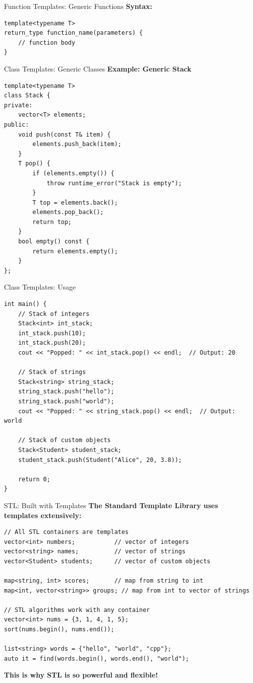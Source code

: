 \begin{frame}[fragile]{Function Templates: Generic Functions}
    \textbf{Syntax:}
    \begin{verbatim}
template<typename T>
return_type function_name(parameters) {
    // function body
}
    \end{verbatim}
\end{frame}

\begin{frame}[fragile]{Class Templates: Generic Classes}
    \textbf{Example: Generic Stack}
    \begin{verbatim}
template<typename T>
class Stack {
private:
    vector<T> elements;
public:
    void push(const T& item) {
        elements.push_back(item);
    }
    T pop() {
        if (elements.empty()) {
            throw runtime_error("Stack is empty");
        }
        T top = elements.back();
        elements.pop_back();
        return top;
    }
    bool empty() const {
        return elements.empty();
    }
};
    \end{verbatim}
\end{frame}

\begin{frame}[fragile]{Class Templates: Usage}
    \begin{verbatim}
int main() {
    // Stack of integers
    Stack<int> int_stack;
    int_stack.push(10);
    int_stack.push(20);
    cout << "Popped: " << int_stack.pop() << endl;  // Output: 20

    // Stack of strings
    Stack<string> string_stack;
    string_stack.push("hello");
    string_stack.push("world");
    cout << "Popped: " << string_stack.pop() << endl;  // Output: world

    // Stack of custom objects
    Stack<Student> student_stack;
    student_stack.push(Student("Alice", 20, 3.8));

    return 0;
}
    \end{verbatim}
\end{frame}

\begin{frame}[fragile]{STL: Built with Templates}
    \textbf{The Standard Template Library uses templates extensively:}
    \begin{verbatim}
// All STL containers are templates
vector<int> numbers;           // vector of integers
vector<string> names;          // vector of strings
vector<Student> students;      // vector of custom objects

map<string, int> scores;       // map from string to int
map<int, vector<string>> groups; // map from int to vector of strings

// STL algorithms work with any container
vector<int> nums = {3, 1, 4, 1, 5};
sort(nums.begin(), nums.end());

list<string> words = {"hello", "world", "cpp"};
auto it = find(words.begin(), words.end(), "world");
    \end{verbatim}

    \textbf{This is why STL is so powerful and flexible!}
\end{frame}

